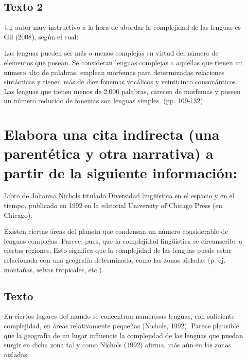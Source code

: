 \documentclass[12pt, a4paper, oneside]{report}
\begin{document}
            \subsection*{Texto 2}
                Un autor muy instructivo a la hora de abordar la complejidad de las lenguas es Gil (2008),
                según el cual:

                \begin{hangingpar}
                    \small
                    Las lenguas pueden ser más o menos complejas en virtud del número de elementos que posean.
                    Se consideran lenguas complejas a aquellas que tienen un número alto de palabras, emplean
                    morfemas para determinadas relaciones sintácticas y tienen más de diez fonemas vocálicos y
                    veinticinco consonánticos. Las lenguas que tienen menos de 2.000 palabras, carecen de
                    morfemas y poseen un número reducido de fonemas son lenguas simples. (pp. 109-132)
                \end{hangingpar}
                \clearpage

        \section{Elabora una cita indirecta (una parentética y otra narrativa) a partir de la siguiente
        información:}

            Libro de Johanna Nichols titulado Diversidad lingüística en el espacio y en el tiempo,
            publicado en 1992 en la editorial University of Chicago Press (en Chicago).

            Existen ciertas áreas del planeta que condensan un número considerable de lenguas complejas.
            Parece, pues, que la complejidad lingüística se circunscribe a ciertas regiones. Esto significa
            que la complejidad de las lenguas puede estar relacionada con una geografía determinada, como las
            zonas aisladas (p. ej. montañas, selvas tropicales, etc.).

            \subsection*{Texto}
                En ciertos lugares del mundo se concentran numerosas lenguas, con suficiente complejidad, en
                áreas relativamente pequeñas (Nichols, 1992). Parece plausible que la geografía de un lugar
                influencie la complejidad de las lenguas que puedan surgir en dicha zona tal y como Nichols
                (1992) afirma, más aún en las zonas aisladas.
\end{document}

